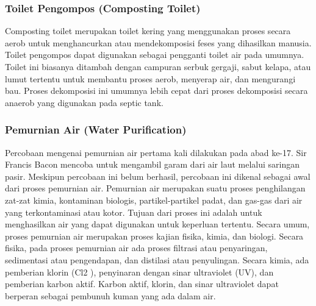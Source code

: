 \documentclass[../wastek.tex]{subfiles}
\begin{document}
\subsubsection{Toilet Pengompos (Composting Toilet)}%
\label{ssub:toilet_pengompos_(composting_toilet)}
Composting toilet merupakan toilet kering yang menggunakan proses secara aerob untuk menghancurkan atau mendekomposisi feses yang dihasilkan manusia. Toilet pengompos dapat digunakan sebagai pengganti toilet air pada umumnya. Toilet ini biasanya ditambah dengan campuran serbuk gergaji, sabut kelapa, atau lumut tertentu untuk membantu proses aerob, menyerap air, dan mengurangi bau. Proses dekomposisi ini umumnya lebih cepat dari proses dekomposisi secara anaerob yang digunakan pada septic tank.

\subsubsection{Pemurnian Air (Water Purification)}%
\label{ssub:pemurnian_air_(water_purification)}

Percobaan mengenai pemurnian air pertama kali dilakukan pada abad ke-17. Sir Francis Bacon mencoba untuk mengambil garam dari air laut melalui saringan pasir. Meskipun percobaan ini belum berhasil, percobaan ini dikenal sebagai awal dari proses pemurnian air. Pemurnian air merupakan suatu proses penghilangan zat-zat kimia, kontaminan biologis, partikel-partikel padat, dan gas-gas dari air yang terkontaminasi atau kotor. Tujuan dari proses ini adalah untuk menghasilkan air yang dapat digunakan untuk keperluan tertentu. Secara umum, proses pemurnian air merupakan proses kajian fisika, kimia, dan biologi. Secara fisika, pada proses pemurnian air ada proses filtrasi atau penyaringan, sedimentasi atau pengendapan, dan distilasi atau penyulingan. Secara kimia, ada pemberian klorin (Cl2 ), penyinaran dengan sinar ultraviolet (UV), dan pemberian karbon aktif. Karbon aktif, klorin, dan sinar ultraviolet dapat berperan sebagai pembunuh kuman yang ada dalam air.
\end{document}
